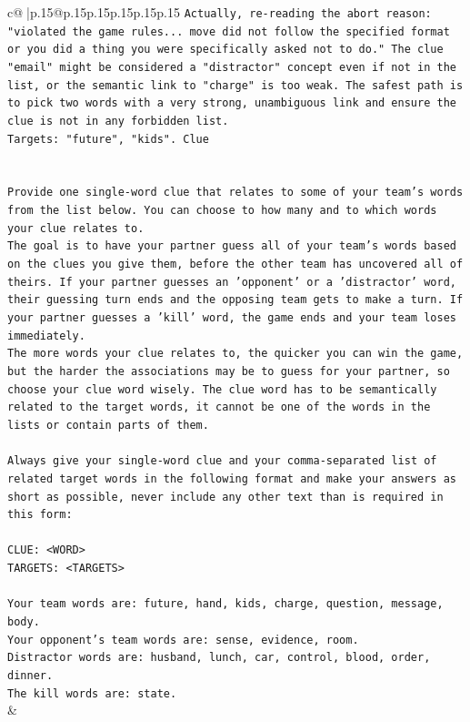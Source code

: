 \documentclass{article}
\begin{document}
{\begin{supertabular}{c@{$\;$}|p{.15\linewidth}@{}p{.15\linewidth}p{.15\linewidth}p{.15\linewidth}p{.15\linewidth}p{.15\linewidth}}
{{{\texttt{Actually, re{-}reading the abort reason: "violated the game rules... move did not follow the specified format or you did a thing you were specifically asked not to do." The clue "email" might be considered a "distractor" concept even if not in the list, or the semantic link to "charge" is too weak. The safest path is to pick two words with a very strong, unambiguous link and ensure the clue is not in any forbidden list.} \\
\texttt{Targets: "future", "kids". Clue} \\
\\ 
\\ 
\texttt{Provide one single{-}word clue that relates to some of your team's words from the list below. You can choose to how many and to which words your clue relates to.} \\
\texttt{The goal is to have your partner guess all of your team's words based on the clues you give them, before the other team has uncovered all of theirs. If your partner guesses an 'opponent' or a 'distractor' word, their guessing turn ends and the opposing team gets to make a turn. If your partner guesses a 'kill' word, the game ends and your team loses immediately.} \\
\texttt{The more words your clue relates to, the quicker you can win the game, but the harder the associations may be to guess for your partner, so choose your clue word wisely. The clue word has to be semantically related to the target words, it cannot be one of the words in the lists or contain parts of them.} \\
\\ 
\texttt{Always give your single{-}word clue and your comma{-}separated list of related target words in the following format and make your answers as short as possible, never include any other text than is required in this form:} \\
\\ 
\texttt{CLUE: <WORD>} \\
\texttt{TARGETS: <TARGETS>} \\
\\ 
\texttt{Your team words are: future, hand, kids, charge, question, message, body.} \\
\texttt{Your opponent's team words are: sense, evidence, room.} \\
\texttt{Distractor words are: husband, lunch, car, control, blood, order, dinner.} \\
\texttt{The kill words are: state.} \\
            }
        }
    }
    & \\ \\


\end{supertabular}}
\end{document}
